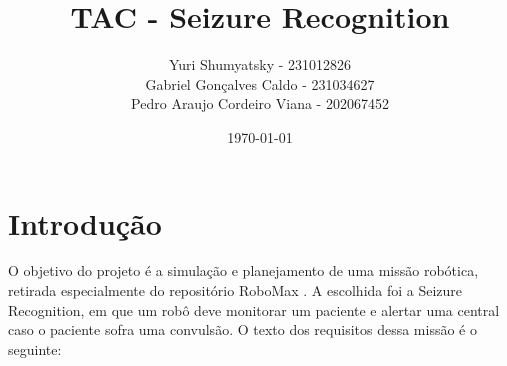 \documentclass[a4 paper]{article}
\title{TAC - Seizure Recognition}
\author{Yuri Shumyatsky - 231012826\\Gabriel Gonçalves Caldo - 231034627\\Pedro Araujo Cordeiro Viana - 202067452}
\date{\today}
\newcommand{\parag}{\hspace{30pt}}
\begin{document}
\maketitle
\newpage

\section{Introdução}
\parag O objetivo do projeto é a simulação e planejamento de uma missão robótica, retirada especialmente do repositório RoboMax \cite{robomax}. A escolhida foi a Seizure Recognition, em que um robô deve monitorar um paciente e alertar uma central caso o paciente sofra uma convulsão. O texto dos requisitos dessa missão é o seguinte:

\begin{adjustwidth}{-3cm}{-3cm}
\begin{center}
\begin{tcolorbox}[width=14.5cm]

\end{tcolorbox}
\end{center}
\end{adjustwidth}
\end{document}
